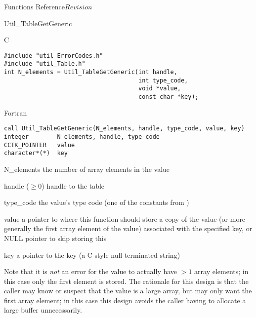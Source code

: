 \begin{cactuspart}{ Functions Reference}{}{$Revision$}
\begin{FunctionDescription}{Util\_TableGetGeneric}
\begin{SynopsisSection}
\begin{Synopsis}{C}
\begin{verbatim}
#include "util_ErrorCodes.h"
#include "util_Table.h"
int N_elements = Util_TableGetGeneric(int handle,
                                      int type_code,
                                      void *value,
                                      const char *key);
\end{verbatim}
\end{Synopsis}
\begin{Synopsis}{Fortran}
\begin{verbatim}
call Util_TableGetGeneric(N_elements, handle, type_code, value, key)
integer        N_elements, handle, type_code
CCTK_POINTER   value
character*(*)  key
\end{verbatim}
\end{Synopsis}
\end{SynopsisSection}

\begin{ResultSection}
\begin{Result}{N\_elements}
the number of array elements in the value
\end{Result}
\end{ResultSection}

\begin{ParameterSection}
\begin{Parameter}{handle ($\ge 0$)}
handle to the table
\end{Parameter}
\begin{Parameter}{type\_code}
the value's type code
(one of the  constants from )
\end{Parameter}
\begin{Parameter}{value}
a pointer to where this function should store a copy of the value
(or more generally the first array element of the value) associated
with the specified key,
or NULL pointer to skip storing this
\end{Parameter}
\begin{Parameter}{key}
a pointer to the key (a C-style null-terminated string)
\end{Parameter}
\end{ParameterSection}

\begin{Discussion}
Note that it is {\em not\/} an error for the value to actually have
$> 1$ array elements; in this case only the first element is stored.
The rationale for this design is that the caller may know or suspect
that the value is a large array, but may only want the first array
element; in this case this design avoids the caller having to allocate
a large buffer unnecessarily.


\end{Discussion}
\end{FunctionDescription}
\end{cactuspart}
